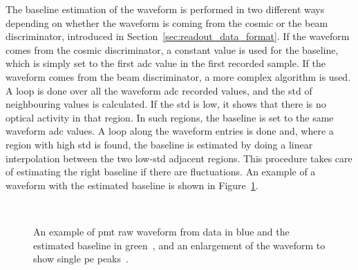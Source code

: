 The baseline estimation of the waveform is performed in two different ways depending on whether the waveform is coming from the cosmic or the beam discriminator, introduced in Section~\ref{sec:readout_data_format}. 
If the waveform comes from the cosmic discriminator, a constant value is used for the baseline, which is simply set to the first \acrshort{adc} value in the first recorded sample.
If the waveform comes from the beam discriminator, a more complex algorithm is used. A loop is done over all the waveform \acrshort{adc} recorded values, and the \acrfull{std} of neighbouring values is calculated. If the \acrshort{std} is low, it shows that there is no optical activity in that region. In such regions, the baseline is set to the same waveform \acrshort{adc} values. A loop along the waveform entries is done and, where a region with high \acrshort{std} is found, the baseline is estimated by doing a linear interpolation between the two low-\acrshort{std} adjacent regions. This procedure takes care of estimating the right baseline if there are fluctuations.
An example of a waveform with the estimated baseline is shown in Figure~\ref{fig:pmt_wf}.

\begin{figure}[]
\centering
{} \quad 
{} \\ 
\caption[PTM Waveform and Baseline Estimation]{An example of \acrshort{pmt} raw waveform from data in blue and the estimated baseline in green~\protect{}, and an enlargement of the waveform to show single \acrshort{pe} peaks~\protect{}.}
\label{fig:pmt_wf}
\end{figure}

